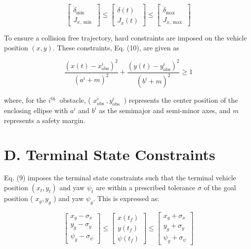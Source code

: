 \documentclass[10pt]{article}
\begin{document}
\[
\left[\begin{array}{c}
\dot{\delta}_{\min }  \tag{15}\\
J_{x, \min }
\end{array}\right] \leq\left[\begin{array}{c}
\dot{\delta}(t) \\
J_{x}(t)
\end{array}\right] \leq\left[\begin{array}{c}
\dot{\delta}_{\max } \\
J_{x, \max }
\end{array}\right]
\]

To ensure a collision free trajectory, hard constraints are imposed on the vehicle position $(x, y)$. These constraints, Eq. (10), are given as


\begin{equation*}
\frac{\left(x(t)-x_{\mathrm{obs}}^{i}\right)^{2}}{\left(a^{i}+m\right)^{2}}+\frac{\left(y(t)-y_{\mathrm{obs}}^{i}\right)^{2}}{\left(b^{i}+m\right)^{2}} \geq 1 \tag{16}
\end{equation*}


where, for the $i^{\text {th }}$ obstacle, ( $x_{\text {obs }}^{i}, y_{\text {obs }}^{i}$ ) represents the center position of the enclosing ellipse with $a^{i}$ and $b^{i}$ as the semimajor and semi-minor axes, and $m$ represents a safety margin.

\section*{D. Terminal State Constraints}
Eq. (9) imposes the terminal state constraints such that the terminal vehicle position $\left(x_{t}, y_{t}\right)$ and yaw $\psi_{t}$ are within a prescribed tolerance $\sigma$ of the goal position ( $x_{g}, y_{g}$ ) and yaw $\psi_{g}$. This is expressed as:

\[
\left[\begin{array}{l}
x_{g}-\sigma_{x}  \tag{17}\\
y_{g}-\sigma_{y} \\
\psi_{g}-\sigma_{\psi}
\end{array}\right] \leq\left[\begin{array}{l}
x\left(t_{f}\right) \\
y\left(t_{f}\right) \\
\psi\left(t_{f}\right)
\end{array}\right] \leq\left[\begin{array}{l}
x_{g}+\sigma_{x} \\
y_{g}+\sigma_{y} \\
\psi_{g}+\sigma_{\psi}
\end{array}\right]
\]
\end{document}
